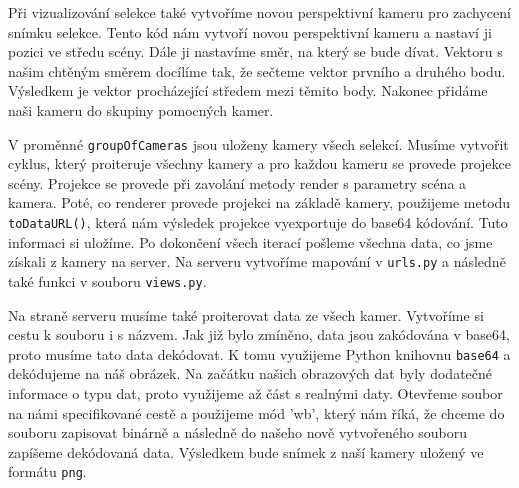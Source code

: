 \documentclass[czech,bachelor,dept420,male,cpdeclaration]{diploma}
\begin{document}
 

Při vizualizování selekce také vytvoříme novou perspektivní kameru pro zachycení snímku selekce. Tento kód nám vytvoří novou perspektivní kameru a nastaví ji pozici ve středu scény. Dále ji nastavíme směr, na který se bude dívat. Vektoru s našim chtěným směrem docílíme tak, že sečteme vektor prvního a druhého bodu. Výsledkem je vektor procházející středem mezi těmito body. Nakonec přidáme naši kameru do skupiny pomocných kamer. 

 

V proměnné \texttt{groupOfCameras} jsou uloženy kamery všech selekcí. Musíme vytvořit cyklus, který proiteruje všechny kamery a pro každou kameru se provede projekce scény. Projekce se provede při zavolání metody render s parametry scéna a kamera. Poté, co renderer provede projekci na základě kamery, použijeme metodu \texttt{toDataURL()}, která nám výsledek projekce vyexportuje do base64 kódování. Tuto informaci si uložíme. Po dokončení všech iterací pošleme všechna data, co jsme získali z kamery na server. Na serveru vytvoříme mapování v \texttt{urls.py} a následně také funkci v souboru \texttt{views.py}. 



Na straně serveru musíme také proiterovat data ze všech kamer. Vytvoříme si cestu k souboru i s názvem. Jak již bylo zmíněno, data jsou zakódována v base64, proto musíme tato data dekódovat. K tomu využijeme Python knihovnu \texttt{base64} a dekódujeme na náš obrázek. Na začátku našich obrazových dat byly dodatečné informace o typu dat, proto využijeme až část s realnými daty. Otevřeme soubor na námi specifikované cestě a použijeme mód 'wb', který nám říká, že chceme do souboru zapisovat binárně a následně do našeho nově vytvořeného souboru zapíšeme dekódovaná data. Výsledkem bude snímek z naší kamery uložený ve formátu \texttt{png}.
\end{document}
